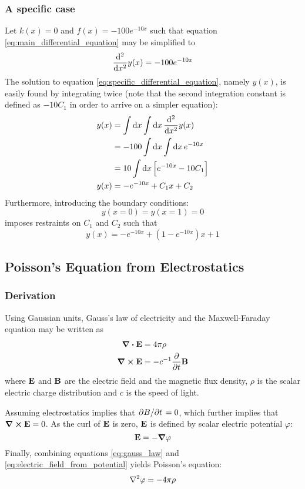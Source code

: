 \documentclass[reprint,english]{revtex4-1}
\begin{document}
\subsubsection{A specific case}\label{sec:specific_case}
Let \(k(x)=0\) and \(f(x)=-100e^{-10x}\) such that equation \ref{eq:main_differential_equation} may be simplified to
\begin{equation}\label{eq:specific_differential_equation}
\dv[2]{x}y(x)=-100e^{-10x}
\end{equation}
The solution to equation \eqref{eq:specific_differential_equation}, namely \(y(x)\), is easily found by integrating twice (note that the second integration constant is defined as \(-10C_1\) in order to arrive on a simpler equation):
\begin{align}
y(x)&=\int\dd{x}\int\dd{x}\dv[2]{x}y(x)\nonumber\\
&=-100\int\dd{x}\int\dd{x}e^{-10x}\nonumber\\
&=10\int\dd{x}\Big[e^{-10x}-10C_1\Big]\nonumber\\
y(x)&=-e^{-10x}+C_1x+C_2\label{eq:general_solution_to_specific}
\end{align}
Furthermore, introducing the boundary conditions:
\[y(x=0)=y(x=1)=0\]
imposes restraints on \(C_1\) and \(C_2\) such that
\begin{equation}\label{eq:specific_solution_to_specific}
y(x)=-e^{-10x}+(1-e^{-10x})x+1
\end{equation}
\subsection{Poisson's Equation from Electrostatics}\label{sec:poisson_equation}
\subsubsection{Derivation}
Using Gaussian units, Gauss's law of electricity and the Maxwell-Faraday equation may be written as
\begin{align}
\div\vb{E}&=4\pi\rho\label{eq:gauss_law}\\
\curl\vb{E}&=-c^{-1}\pdv{t}\vb{B}\label{eq:maxwell-farady_equation}
\end{align}
where \(\vb{E}\) and \(\vb{B}\) are the electric field and the magnetic flux density, \(\rho\) is the scalar electric charge distribution and \(c\) is the speed of light.

Assuming electrostatics implies that \(\pdv*{B}{t}=0\), which further implies that \(\curl\vb{E}=0\). As the curl of \(\vb{E}\) is zero, \(\vb{E}\) is defined by scalar electric potential \(\varphi\):
\begin{equation}\label{eq:electric_field_from_potential}
\vb{E}=-\grad\varphi
\end{equation}
Finally, combining equations \eqref{eq:gauss_law} and \eqref{eq:electric_field_from_potential} yields Poisson's equation:
\begin{equation}\label{eq:poisson_equation_electrostatics}
\laplacian\varphi=-4\pi\rho
\end{equation}
\newpage
\end{document}
